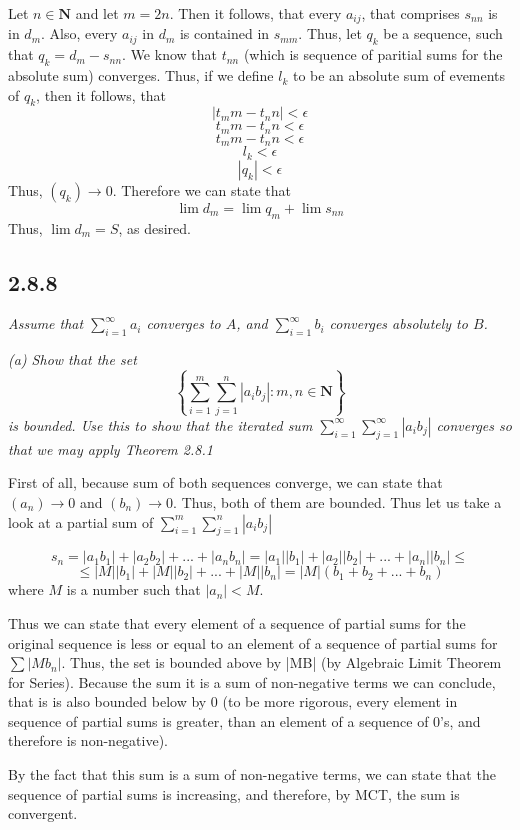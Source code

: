 \documentclass[11pt,oneside,titlepage]{book}
\begin{document}
Let $n \in \textbf{N}$ and let $m = 2n$. Then it follows, that
every $a_{ij}$, that comprises $s_{nn}$ is in $d_{m}$. Also, every $a_{ij}$
in $d_{m}$ is contained in $s_{mm}$. Thus, let $q_k$ be a sequence, such that
$q_k = d_m - s_{nn}$. We know that $t_{nn}$ (which is sequence of  paritial
sums for the absolute sum) converges. Thus, if we define $l_k$ to be an
absolute sum of evements of $q_k$, then it follows, that 
$$ |t_mm - t_nn| < \epsilon $$
$$ t_mm - t_nn < \epsilon $$
$$ t_mm - t_nn < \epsilon $$
$$  l_k < \epsilon $$
$$|q_k| < \epsilon$$
Thus, $(q_k) \to 0$. Therefore we can state that
$$\lim d_m = \lim q_m + \lim s_{nn}$$
Thus, $\lim d_m = S$, as desired.

\subsection*{2.8.8}
\textit{Assume that $\sum_{i = 1}^{\infty} a_i$  converges to $A$, and
  $\sum_{i = 1}^{\infty} b_i$ converges absolutely to $B$.}

\textit{(a) Show that the set}
$$\left\{\sum_{i = 1}^{m}\sum_{j = 1}^{n}|a_i b_j|: m,n \in \textbf{N}\right\}$$
\textit{is bounded. Use this to show that the iterated sum
  $\sum_{i = 1}^{\infty}\sum_{j = 1}^{\infty}|a_i b_j|$ converges so that we
  may apply Theorem 2.8.1}


First of all, because sum of both sequences converge, we can state that
$(a_n) \to 0$ and $(b_n) \to 0$. Thus, both of them are bounded. Thus
let us take a look at a partial sum of $\sum_{i = 1}^{m}\sum_{j = 1}^{n}|a_i b_j|$

$$s_n = |a_1 b_1| + |a_2 b_2| + ... + |a_n b_n| =
|a_1||b_1| + |a_2 || b_2| + ... + |a_n ||b_n| \leq$$
$$\leq |M||b_1| + |M||b_2| + ... + |M||b_n| = |M|(b_1 + b_2 + ... + b_n)$$
where $M$ is a number such that $|a_n| < M$.

Thus we can state that every element of a sequence of partial sums for the
original sequence is less or equal to an element of a sequence of partial sums
for $\sum |Mb_n|$. Thus, the set is bounded above by |MB| (by Algebraic Limit
Theorem for Series). Because the sum it is a sum of non-negative terms we
can conclude, that is is also bounded below by 0 (to be more rigorous, every
element in sequence of partial sums is greater, than an element of a sequence
of 0's, and therefore is non-negative).

By the fact that this sum is a sum of non-negative terms, we can state that
the sequence of partial sums is increasing, and therefore, by MCT, the sum
is convergent.
\end{document}
